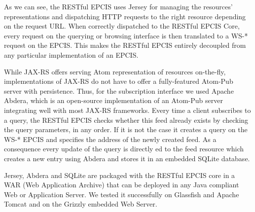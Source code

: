 As we can see, the RESTful EPCIS uses Jersey for managing the resources' representations and dispatching HTTP requests to the right resource depending on the request URL. When correctly dispatched to the RESTful EPCIS Core, every request on the querying or browsing interface is then translated to a WS-* request on the EPCIS. This makes the RESTful EPCIS entirely decoupled from any particular implementation of an EPCIS.

While JAX-RS offers serving Atom representation of resources on-the-fly, implementations of JAX-RS do not have to offer a fully-featured Atom-Pub server with persistence. Thus, for the subscription interface we used Apache Abdera, which is an open-source implementation of an Atom-Pub server integrating well with most JAX-RS frameworks. Every time a client subscribes to a query, the RESTful EPCIS checks whether this feed already exists by checking the query parameters, in any order. If it is not the case it creates a query on the WS-* EPCIS and specifies the address of the newly created feed. As a consequence every update of the query is directly ed to the feed resource which creates a new entry using Abdera and stores it in an embedded SQLite database.

Jersey, Abdera and SQLite are packaged with the RESTful EPCIS core in a WAR (Web Application Archive) that can be deployed in any Java compliant Web or Application Server. We tested it successfully on Glassfish and Apache Tomcat and on the Grizzly embedded Web Server.